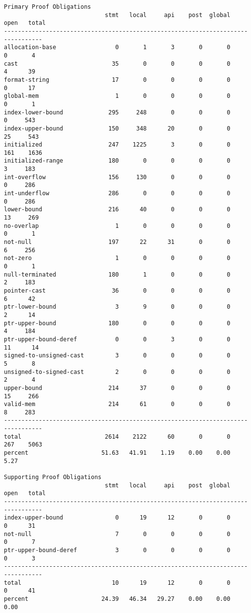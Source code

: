 \documentclass[11pt]{article}
\begin{document}
\begin{scriptsize}
\begin{verbatim}
Primary Proof Obligations
                             stmt   local     api    post  global    open   total
---------------------------------------------------------------------------------
allocation-base                 0       1       3       0       0       0       4
cast                           35       0       0       0       0       4      39
format-string                  17       0       0       0       0       0      17
global-mem                      1       0       0       0       0       0       1
index-lower-bound             295     248       0       0       0       0     543
index-upper-bound             150     348      20       0       0      25     543
initialized                   247    1225       3       0       0     161    1636
initialized-range             180       0       0       0       0       3     183
int-overflow                  156     130       0       0       0       0     286
int-underflow                 286       0       0       0       0       0     286
lower-bound                   216      40       0       0       0      13     269
no-overlap                      1       0       0       0       0       0       1
not-null                      197      22      31       0       0       6     256
not-zero                        1       0       0       0       0       0       1
null-terminated               180       1       0       0       0       2     183
pointer-cast                   36       0       0       0       0       6      42
ptr-lower-bound                 3       9       0       0       0       2      14
ptr-upper-bound               180       0       0       0       0       4     184
ptr-upper-bound-deref           0       0       3       0       0      11      14
signed-to-unsigned-cast         3       0       0       0       0       5       8
unsigned-to-signed-cast         2       0       0       0       0       2       4
upper-bound                   214      37       0       0       0      15     266
valid-mem                     214      61       0       0       0       8     283
---------------------------------------------------------------------------------
total                        2614    2122      60       0       0     267    5063
percent                     51.63   41.91    1.19    0.00    0.00    5.27

Supporting Proof Obligations
                             stmt   local     api    post  global    open   total
---------------------------------------------------------------------------------
index-upper-bound               0      19      12       0       0       0      31
not-null                        7       0       0       0       0       0       7
ptr-upper-bound-deref           3       0       0       0       0       0       3
---------------------------------------------------------------------------------
total                          10      19      12       0       0       0      41
percent                     24.39   46.34   29.27    0.00    0.00    0.00
\end{verbatim}
\end{scriptsize}
\end{document}
